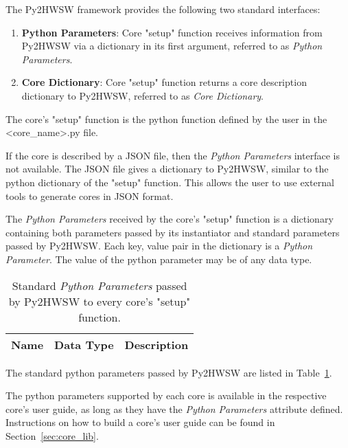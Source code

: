 %

The Py2HWSW framework provides the following two standard interfaces:
\begin{enumerate}
  \item \textbf{Python Parameters}: Core "setup" function receives information from Py2HWSW via a dictionary in its first argument, referred to as \textit{Python Parameters}.
  \item \textbf{Core Dictionary}: Core "setup" function returns a core description dictionary to Py2HWSW, referred to as \textit{Core Dictionary}.
\end{enumerate}

The core's "setup" function is the python function defined by the user in the <core\_name>.py file.

If the core is described by a JSON file, then the \textit{Python Parameters} interface is not available.
The JSON file gives a dictionary to Py2HWSW, similar to the python dictionary of the "setup" function.
This allows the user to use external tools to generate cores in JSON format.

%
%

The \textit{Python Parameters} received by the core's "setup" function is a dictionary containing both parameters passed by its instantiator and standard parameters passed by Py2HWSW.
Each key, value pair in the dictionary is a \textit{Python Parameter}.
The value of the python parameter may be of any data type.

\begin{table}[H]
  \centering
  \begin{tabularx}{\textwidth}{|l|l|X|}

    \hline
    \rowcolor{iob-green}
    {\bf Name} & {\bf Data Type} & {\bf Description}  \\ \hline \hline


  \end{tabularx}
  \caption{Standard \textit{Python Parameters} passed by Py2HWSW to every core's "setup" function.}
  \label{py2hwsw_py_params_tab}
\end{table}

The standard python parameters passed by Py2HWSW are listed in Table~\ref{py2hwsw_py_params_tab}.

The python parameters supported by each core is available in the respective core's user guide, as long as they have the \textit{Python Parameters} attribute defined.
Instructions on how to build a core's user guide can be found in Section~\ref{sec:core_lib}. 


